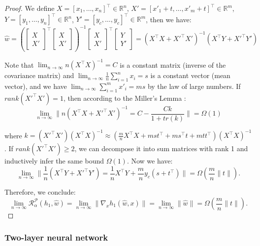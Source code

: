 \begin{proof}
We define $X = [x_1, \dots, x_n]^\top \in \mathbb{R}^n$, $X' = [x'_1+t, \dots, x'_m+t]^\top \in \mathbb{R}^m$, $Y = [y_1, \dots, y_n]^\top \in \mathbb{R}^n$, $Y' = [y_c, \dots, y_c]^\top \in \mathbb{R}^m$, then we have:
$$
\hat{w} = \left( \begin{bmatrix}X \\ X' \end{bmatrix}^\top \begin{bmatrix}X \\ X' \end{bmatrix} \right)^{-1} \begin{bmatrix}X \\ X' \end{bmatrix}^\top \begin{bmatrix}Y \\ Y' \end{bmatrix}
= \left( X^\top X + X'^\top X' \right)^{-1} \left( X^\top Y + X'^\top Y' \right)
$$

Note that $\lim_{n\to\infty} n\left( X^\top X \right)^{-1} = C$ is a constant matrix (inverse of the covariance matrix) and $\lim_{n\to\infty} \frac{1}{n} \sum_{i=1}^n x_i = s$ is a constant vector (mean vector), and we have $\lim_{n\to\infty} \sum_{i=1}^m x'_i = ms $ by the law of large numbers. If $rank(X'^\top X') = 1$, then according to the Miller's Lemma \cite{miller1981inverse}:
$$
\lim_{n\to\infty}\| n\left( X^\top X + X'^\top X' \right)^{-1} = C - \frac{Ck}{1 + tr(k)} \| = \Omega(1)
$$

where $k = \left( X'^\top X' \right) \left( X^\top X \right)^{-1} \approx \left( \frac{m}{n} X^\top X + mst^\top + ms^\top t + mtt^\top \right) \left( X^\top X \right)^{-1}$. If $rank(X'^\top X') \geq 2$, we can decompose it into sum matrices with rank 1 and inductively infer the same bound $\Omega(1)$. Now we have:
$$
\lim_{n\to\infty} \| \frac{1}{n} \left( X^\top Y + X'^\top Y' \right) = \frac{1}{n} X^\top Y + \frac{m}{n} y_c (s + t^\top) \| = \Omega(\frac{m}{n} \| t \|).
$$

Therefore, we conclude:
$$
\lim_{n\to\infty} \mathcal{R}^{\mathcal{P}}_{\alpha}(h_1,\hat{w}) = \lim_{n\to\infty} \| \nabla_x h_1(\hat{w}, x) \| = \lim_{n\to\infty} \| \hat{w} \| = \Omega \left(\frac{m}{n} \| t \| \right).
$$

\end{proof}


\subsubsection{Two-layer neural network}

